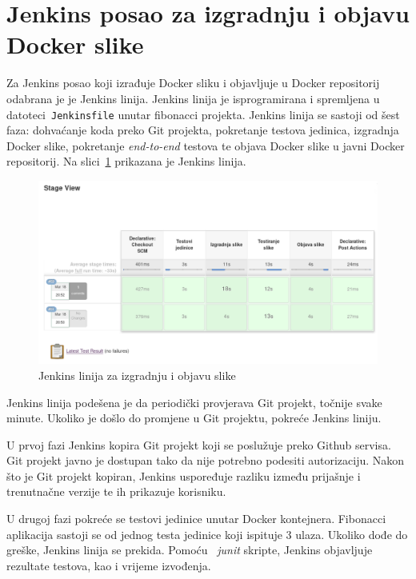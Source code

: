 \section{Jenkins posao za izgradnju i objavu Docker slike}
Za Jenkins posao koji izrađuje Docker sliku i objavljuje u Docker repositorij odabrana je je Jenkins
linija. Jenkins linija je isprogramirana i spremljena u datoteci~\texttt{Jenkinsfile} unutar
fibonacci projekta. Jenkins linija se sastoji od šest faza: dohvaćanje koda preko Git projekta,
pokretanje testova jedinica, izgradnja Docker slike, pokretanje \textit{end-to-end} testova te
objava Docker slike u javni Docker repositorij. Na slici~\ref{fig:03jenkins_pipeline} prikazana je
Jenkins linija.

\begin{figure}[h]
    \centering
    \includegraphics[width=\textwidth]{img/03/jenkins_pipeline.png}
    \caption{Jenkins linija za izgradnju i objavu slike}%
    \label{fig:03jenkins_pipeline}
\end{figure}

Jenkins linija podešena je da periodički provjerava Git projekt, točnije svake minute. Ukoliko je
došlo do promjene u Git projektu, pokreće Jenkins liniju.

U prvoj fazi Jenkins kopira Git projekt koji se poslužuje preko Github servisa. Git projekt javno je
dostupan tako da nije potrebno podesiti autorizaciju. Nakon što je Git projekt kopiran, Jenkins
uspoređuje razliku između prijašnje i trenutnačne verzije te ih prikazuje korisniku.

U drugoj fazi pokreće se testovi jedinice unutar Docker kontejnera. Fibonacci aplikacija sastoji se
od jednog testa jedinice koji ispituje 3 ulaza. Ukoliko dođe do greške, Jenkins linija se prekida.
Pomoću ~\textit{junit} skripte, Jenkins objavljuje rezultate testova, kao i vrijeme izvođenja.

